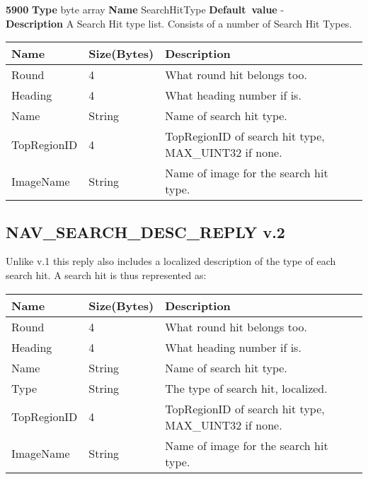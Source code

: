 \documentclass[a4paper]{article}
\begin{document}
\begin{list}{\textbf{ParamID}}{}
\item \textbf{5900} \textbf{Type} byte array \textbf{Name} SearchHitType
                 \textbf{Default~value} - \\
  \textbf{Description} A Search Hit type list. Consists of a number of Search
  Hit Types. \\
  \begin{tabular}{|l|l|p{60mm}|}
    \hline
    Name      & Size(Bytes) & Description \\\hline
    Round     & 4           & What round hit belongs too. \\\hline
    Heading   & 4           & What heading number if is. \\\hline
    Name      & String      & Name of search hit type. \\\hline
    TopRegionID& 4          & TopRegionID of search hit type, MAX\_UINT32 if 
                              none. \\\hline
    ImageName & String      & Name of image for the search hit type. \\\hline
  \end{tabular}
\end{list}

\subsection{NAV\_SEARCH\_DESC\_REPLY v.2}

Unlike v.1 this reply also includes a localized description of the type of each search hit. A search hit is thus represented as:

\begin{tabular}{|l|l|p{60mm}|}
  \hline
  Name      & Size(Bytes) & Description \\\hline
  Round     & 4           & What round hit belongs too. \\\hline
  Heading   & 4           & What heading number if is. \\\hline
  Name      & String      & Name of search hit type. \\\hline
  Type      & String      & The type of search hit, localized. \\\hline
  TopRegionID& 4          & TopRegionID of search hit type, MAX\_UINT32 if 
                            none. \\\hline
  ImageName & String      & Name of image for the search hit type. \\\hline
\end{tabular}
\end{document}
